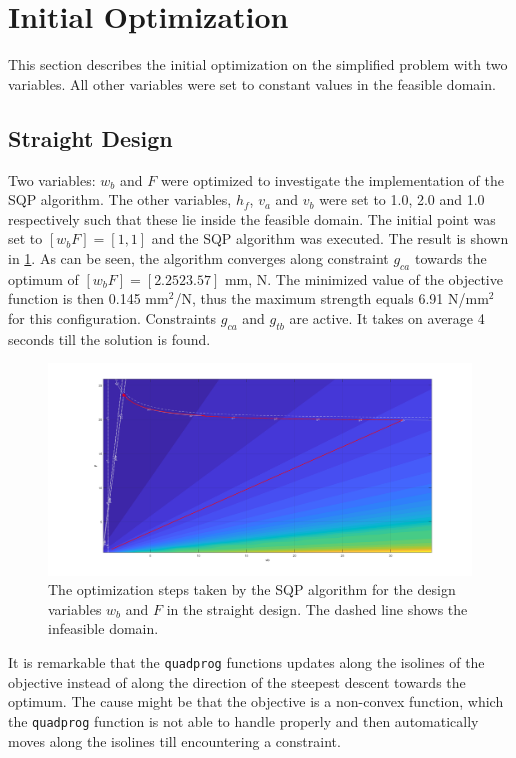\section{Initial Optimization}
This section describes the initial optimization on the simplified problem with two variables. 
All other variables were set to constant values in the feasible domain. 

\subsection{Straight Design}
Two variables: $w_b$ and $F$ were optimized to investigate the implementation of the SQP algorithm. 
The other variables, $h_f$, $v_a$ and $v_b$ were set to 1.0, 2.0 and 1.0 respectively such that these lie inside the feasible domain. 
The initial point was set to $[w_b F] = [1, 1]$ and the SQP algorithm was executed. 
The result is shown in \cref{fig:straightopt}.
As can be seen, the algorithm converges along constraint $g_{ca}$ towards the optimum of $[w_b F] = [2.25 23.57]$ mm, N. 
The minimized value of the objective function is then 0.145 mm$^2$/N, thus the maximum strength equals 6.91 N/mm$^2$ for this configuration. 
Constraints $g_{ca}$ and $g_{tb}$ are active. 
It takes on average 4 seconds till the solution is found. 


\begin{figure}[H]
	\centering
	\includegraphics[width=\columnwidth]{sources/plots/straight2var.png}
	\caption{The optimization steps taken by the SQP algorithm for the design variables $w_b$ and $F$ in the straight design.
		The dashed line shows the infeasible domain.}
	\label{fig:straightopt}
\end{figure}

It is remarkable that the \texttt{quadprog} functions updates along the isolines of the objective instead of along the direction of the steepest descent towards the optimum.
The cause might be that the objective is a non-convex function, which the \texttt{quadprog} function is not able to handle properly and then automatically moves along the isolines till encountering a constraint.

